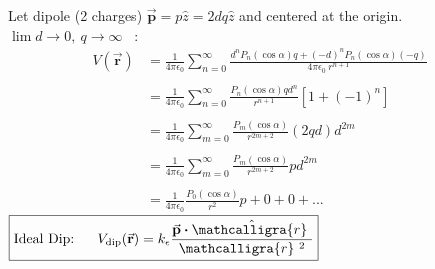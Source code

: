 \documentclass[12pt]{article}
\newcommand{\scripty}[1]{\ensuremath{\mathcalligra{#1}}}
\newcommand{\cursrr}{\scripty{r}\ }
\newcommand{\dotP}{\boldsymbol \cdot}		%
\begin{document}
\vspace{15pt}
\begin{minipage}[t]{0.48\textwidth}
	Let dipole (2 charges) \( \vec{ \mathbf{p} } = p \hat{z} = 2dq \hat{z} \) and centered at the origin. \\[15pt]
	\(\lim d \rightarrow 0, \ q \rightarrow \infty \) \ :
	\begin{align*}
		V( \vec{ \mathbf{r} } ) &= \frac{1}{4 \pi \epsilon_0} \sum_{n=0}^\infty 
			\frac{ d^n P_n (\cos{\alpha}) q+ (-d)^n P_n (\cos{\alpha}) (-q) }{4 \pi \epsilon_0 \ r^{n+1}} \\ \\
		&= \frac{1}{4 \pi \epsilon_0} \sum_{n=0}^\infty \frac{ P_n (\cos{\alpha}) q d^n }{r^{n+1}} [ 1 + (-1)^n ] \\ \\
		&= \frac{1}{4 \pi \epsilon_0} \sum_{m=0}^\infty \frac{ P_m (\cos{\alpha}) }{r^{2m+2}} (2 q d) d^{2m} \\ \\
		&= \frac{1}{4 \pi \epsilon_0} \sum_{m=0}^\infty \frac{ P_m (\cos{\alpha}) }{r^{2m+2}} p d^{2m} \\ \\
		&= \frac{1}{4 \pi \epsilon_0} \frac{ P_0 (\cos{\alpha}) }{r^{2}} p + 0 + 0 + ...
	\end{align*}
	\hfill \break
	\( \boxed{ \text{Ideal Dip:} \ \ \ \ \  V_{ \text{dip} }( \vec{ \mathbf{r} } ) 
		= k_\epsilon \frac{ \vec{ \mathbf{p} } \dotP \hat{\cursrr} }{\cursrr^{2}} } \)
\end{minipage}
\hfill\vline\hfill
\end{document}
